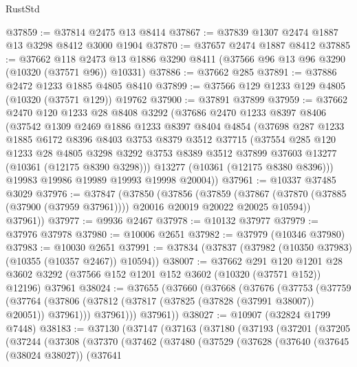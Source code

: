 \begin{lexlean}{RustStd}
\begin{coremodule}
@37859 := @37814 @2475 @13 @8414
@37867 := @37839 @1307 @2474 @1887 @13 @3298 @8412 @3000 @1904
@37870 := @37657 @2474 @1887 @8412
@37885 := @37662
    @118
    @2473
    @13
    @1886
    @3290
    @8411
    (@37566 @96 @13 @96 @3290 (@10320 (@37571 @96)) @10331)
@37886 := @37662 @285
@37891 := @37886 @2472 @1233 @1885 @4805 @8410
@37899 := @37566 @129 @1233 @129 @4805 (@10320 (@37571 @129)) @19762
@37900 := @37891 @37899
@37959 := @37662
    @2470
    @120
    @1233
    @28
    @8408
    @3292
    (@37686
      @2470
      @1233
      @8397
      @8406
      (@37542
        @1309
        @2469
        @1886
        @1233
        @8397
        @8404
        @4854
        (@37698
          @287
          @1233
          @1885
          @6172
          @8396
          @8403
          @3753
          @8379
          @3512
          @37715
          (@37554
            @285
            @120
            @1233
            @28
            @4805
            @3298
            @3292
            @3753
            @8389
            @3512
            @37899
            @37603
            @13277
            (@10361 (@12175 @8390 @3298)))
          @13277
          (@10361 (@12175 @8380 @8396)))
        @19983
        @19986
        @19989
        @19993
        @19998
        @20004))
@37961 := @10337 @37485 @3029
@37976 := @37847
    (@37850
      (@37856
        (@37859
          (@37867 (@37870 (@37885 (@37900 (@37959 @37961)))) @20016 @20019 @20022 @20025 @10594))
        @37961))
@37977 := @9936 @2467
@37978 := @10132 @37977
@37979 := @37976 @37978
@37980 := @10006 @2651
@37982 := @37979 (@10346 @37980)
@37983 := @10030 @2651
@37991 := @37834 (@37837 (@37982 (@10350 @37983) (@10355 (@10357 @2467)) @10594))
@38007 := @37662
    @291
    @120
    @1201
    @28
    @3602
    @3292
    (@37566 @152 @1201 @152 @3602 (@10320 (@37571 @152)) @12196)
    @37961
@38024 := @37655
    (@37660
      (@37668
        (@37676
          (@37753
            (@37759
              (@37764 (@37806 (@37812 (@37817 (@37825 (@37828 (@37991 @38007)) @20051)) @37961)))
              @37961)))
        @37961))
@38027 := @10907 (@32824 @1799 @7448)
@38183 := @37130
    (@37147
      (@37163
        (@37180
          (@37193
            (@37201
              (@37205
                (@37244
                  (@37308
                    (@37370
                      (@37462
                        (@37480
                          (@37529
                            (@37628
                              (@37640
                                (@37645 (@38024 @38027))
                                (@37641

\end{coremodule}
\end{lexlean}
